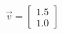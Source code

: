 \documentclass[preview]{standalone}
\begin{document}
\begin{align*}
\vec{v}=\begin{bmatrix}1.5\\1.0\end{bmatrix}
\end{align*}
\end{document}

